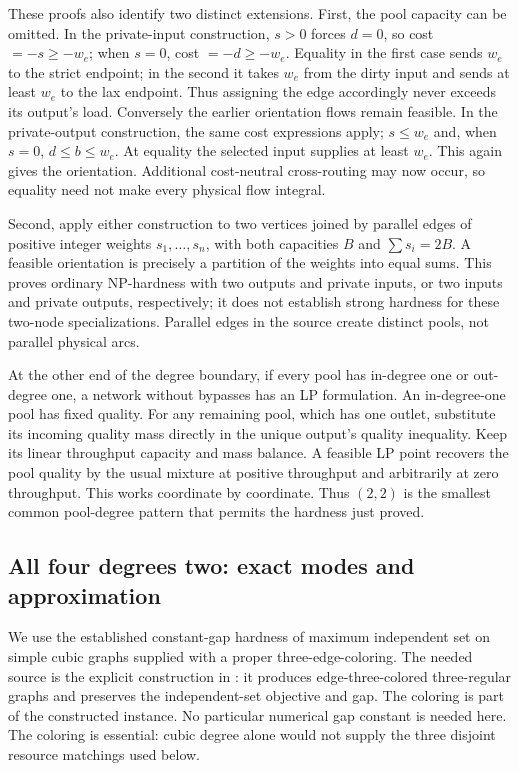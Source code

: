 These proofs also identify two distinct extensions. First, the pool
capacity can be omitted. In the private-input construction, $s>0$
forces $d=0$, so cost $=-s\ge-w_e$; when $s=0$, cost $=-d\ge-w_e$.
Equality in the first case sends $w_e$ to the strict endpoint; in the
second it takes $w_e$ from the dirty input and sends at least $w_e$ to
the lax endpoint. Thus assigning the edge accordingly never exceeds
its output's load. Conversely the earlier orientation flows remain
feasible. In the private-output construction, the same cost expressions
apply; $s\le w_e$ and, when $s=0$, $d\le b\le w_e$. At equality the
selected input supplies at least $w_e$. This again gives the orientation.
Additional cost-neutral cross-routing may now occur, so equality need
not make every physical flow integral.

Second, apply either construction to two vertices joined by parallel
edges of positive integer weights $s_1,\ldots,s_n$, with both capacities
$B$ and $\sum s_i=2B$. A feasible orientation is precisely a partition
of the weights into equal sums. This proves ordinary NP-hardness with
two outputs and private inputs, or two inputs and private outputs,
respectively; it does not establish strong hardness for these two-node
specializations. Parallel edges in the source create distinct pools,
not parallel physical arcs.

At the other end of the degree boundary, if every pool has in-degree
one or out-degree one, a network without bypasses has an LP formulation.
An in-degree-one pool has fixed quality. For any remaining pool, which
has one outlet, substitute its incoming quality mass directly in the
unique output's quality inequality. Keep its linear throughput capacity
and mass balance. A feasible LP point recovers the pool quality by the
usual mixture at positive throughput and arbitrarily at zero throughput.
This works coordinate by coordinate. Thus $(2,2)$ is the smallest common
pool-degree pattern that permits the hardness just proved.

\subsection{All four degrees two: exact modes and approximation}\label{s3:all-two}

We use the established constant-gap hardness of maximum independent set
on simple cubic graphs supplied with a proper three-edge-coloring.
The needed source is the explicit construction in
\citet[author manuscript, Section~5(A), pp.~25--26]{s3:chlebik2006}:
it produces edge-three-colored three-regular graphs and preserves the
independent-set objective and gap. The coloring is part of the constructed
instance. No particular numerical gap constant is needed here. The coloring is
essential: cubic degree alone would not supply the three disjoint
resource matchings used below.

